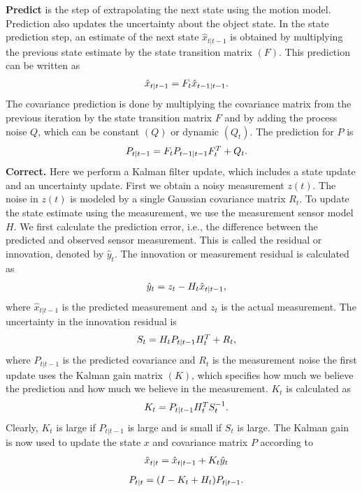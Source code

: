 \textbf{Predict} 
is the step of extrapolating the next state using the motion model. Prediction also updates the uncertainty about the object state.
In the state prediction step, an estimate of the next state $ \hat{x}_{t|t-1} $ is obtained by multiplying the previous state estimate by the state transition matrix $(F)$. This prediction can be written as 
\[
\begin{array}{lc}
{\rm } & {\hat{x}_{t|t-1}} = F_t \hat{x}_{t-1|t-1}.  
\end{array}
\]
The covariance prediction is done by multiplying the covariance matrix from the previous iteration by the state transition matrix $F$ and by adding the process noise $Q$, which can be constant $(Q)$ or dynamic $(Q_t)$. The prediction for $P$ is
\[
\begin{array}{lc}
{\rm } & {P_{t|t-1}} = F_t P_{t-1|t-1} F_t^{T}+ Q_{t}.  
\end{array}
\]
\textbf{Correct.} Here we perform a Kalman filter update, which includes a state update and an uncertainty update. First we obtain a noisy measurement $z(t)$. The noise in $z(t)$ is modeled by a single Gaussian covariance matrix $R_t$. To update the state estimate using the measurement, we use the measurement sensor model $H$. We first calculate the prediction error, i.e., the difference between the predicted and observed sensor measurement. This is called the residual or innovation, denoted by $\hat{y}_t$. The innovation or measurement residual is calculated as
\[
\begin{array}{lc}
{\rm } & {\hat{y}_t = z_t - H_t \hat{x}_{t|t-1} ,} 
\end{array}
\]
where $\hat{x}_{t|t-1}$ is the predicted measurement and $z_t$ is the actual measurement. The uncertainty in the innovation residual is 
\[
\begin{array}{lc}
{\rm } & {S_t = H_t P_{t|t-1} H_t^{T} + R_t ,} 
\end{array}
\]
where $P_{t|t-1}$ is the predicted covariance and $R_t$ is the measurement noise the first update uses the Kalman gain matrix $(K)$, which specifies how much we believe the prediction and how much we believe in the measurement. $K_t$ is calculated as 
\[
\begin{array}{lc}
{\rm } & {K_t =  P_{t|t-1} H_t^{T}S_t^{-1} .} 
\end{array}
\]
Clearly, $K_t$ is large if $P_{t|t-1}$ is large and is small if $S_t$ is large. The Kalman gain is now used to update the state $x$ and covariance matrix $P$ according to
\[
\begin{array}{lc}
{\rm } & {\hat{x}_{t|t} =  \hat{x}_{t|t-1} + K_t\hat{y}_{t}} 
\end{array}
\]
\[
\begin{array}{lc}
{\rm } & {P_{t|t} =  (I- K_t + H_t)P_{t|t-1}.} 
\end{array}
\]

